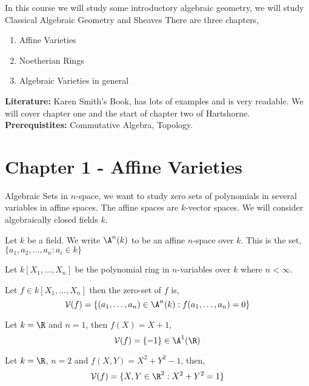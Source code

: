 
\noindent
In this course we will study some introductory algebraic geometry, we will study Classical Algebraic Geometry and Sheaves
There are three chapters,
\begin{enumerate}
  \item Affine Varieties
  \item Noetherian Rings
  \item Algebraic Varieties in general
\end{enumerate}

\noindent
\textbf{Literature: }Karen Smith's Book, has lots of examples and is very readable. We will cover chapter one and the start of chapter two of Hartshorne.\\

\noindent
\textbf{Prerequistites: }Commutative Algebra, Topology.

\section{Chapter 1 - Affine Varieties}
Algebraic Sets in $n$-space, we want to study zero sets of polynomials in several variables in affine spaces. The affine spaces are $k$-vector spaces. We will consider algebraically closed fields $k$. \\

\begin{ndefi}
  Let $k$ be a field. We write $\A^n(k)$ to be an affine $n$-space over $k$. This is the set, $\{a_{1}, a_{2}, \dots, a_n : a_i \in k\}$\\
\end{ndefi}

Let $k[X_1, \dots, X_n]$ be the polynomial ring in $n$-variables over $k$ where $n < \infty$.
\begin{ndefi}
  Let $f \in k[X_1, \dots, X_n]$ then the zero-set of $f$ is,
  $$ \mathcal{V}(f) = \{(a_1, \dots, a_n) \in \A^n(k) : f(a_1, \dots, a_n) = 0\} $$
\end{ndefi}

\begin{eg}
  Let $k = \R$ and $n = 1$, then $f(X) = X + 1$,
  $$ \mathcal{V}(f) = \{-1\} \in \A^1(\R) $$
\end{eg}

\begin{eg}
  Let $k = \R$, $n = 2$ and $f(X, Y) = X^2 + Y^2 - 1$, then,
  $$ \mathcal{V}(f) = \{X, Y \in \R^2 : X^2 + Y^2 = 1\} $$
\end{eg}

